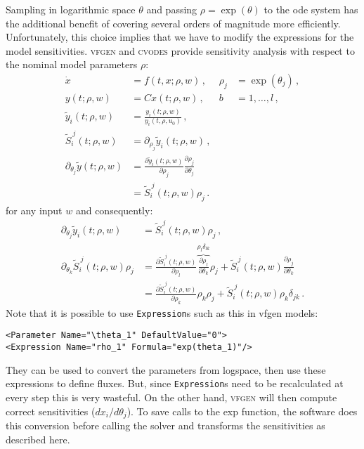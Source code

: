 \documentclass[utf8,english]{scrartcl}
\begin{document}
Sampling in logarithmic space $\theta$ and passing $\rho=\exp(\theta)$
to the ode system has the additional benefit of covering several
orders of magnitude more efficiently. Unfortunately, this choice
implies that we have to modify the expressions for the model
sensitivities. \textsc{vfgen} and \textsc{cvodes} provide
sensitivity analysis with respect to the nominal model parameters
$\rho$:
\begin{align}
  \dot x&=f(t,x;\rho,w)\,,& \rho_j&=\exp(\theta_j)\,,\nonumber\\
  y(t;\rho,w)&=C x(t;\rho,w)\,,& b&=1,\dots,l\,,\nonumber\\
  \tilde y_i(t;\rho,w)&=\frac{y_i(t;\rho,w)}{y_i(t,\rho,u_0)}\,,\label{eq:ode_rho}\\
  \tilde S_i^{~j}(t;\rho,w)&=\partial_{\rho_j} \tilde y_i(t;\rho,w)\,,\nonumber\\
  \partial_{\theta_j}\tilde y(t;\rho,w)&=\frac{\partial\tilde y_i(t;\rho,w)}{\partial\rho_j}\frac{\partial \rho_j}{\partial\theta_j}\nonumber\\
  &=\tilde S_i^{~j}(t;\rho,w)\rho_j\,.\nonumber
\end{align}
for any input $w$ and consequently:
\begin{align}
  \partial_{\theta_j}\tilde y_i(t;\rho,w)&=\tilde S_i^{~j}(t;\rho,w)\rho_j\,,\nonumber\\
  \partial_{\theta_k}\tilde S_i^{~j}(t;\rho,w)\rho_j&=\frac{\partial
    \tilde
    S_i^{~j}(t;\rho,w)}{\partial\rho_l}\overbrace{\frac{\partial\rho_l}{\partial\theta_k}}^{\rho_l\delta_{lk}}\rho_j
  + \tilde
  S_i^{~j}(t;\rho,w)\frac{\partial\rho_j}{\partial\theta_k}\label{eq:dfyS_rho}\\
  &=\frac{\partial \tilde
    S_i^{~j}(t;\rho,w)}{\partial\rho_k}\rho_k\rho_j + \tilde
  S_i^{~j}(t;\rho,w)\rho_k\delta_{jk}\,.\nonumber
\end{align}
Note that it is possible to use \texttt{Expression}s such as this in vfgen models:
\begin{center}
\begin{verbatim}
<Parameter Name="\theta_1" DefaultValue="0">
<Expression Name="rho_1" Formula="exp(theta_1)"/>
\end{verbatim}
\end{center}
They can be used to convert the parameters from logspace, then use
these expressions to define fluxes. But, since \texttt{Expression}s
need to be recalculated at every step this is very wasteful. On the
other hand, \textsc{vfgen} will then compute correct sensitivities
($dx_i/d\theta_j$). To save calls to the exp function, the software
does this conversion before calling the solver and transforms the
sensitivities as described here.
\end{document}
